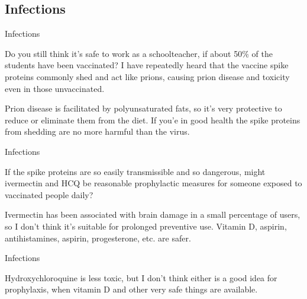 \documentclass[11pt,oneside,openany,extrafontsizes]{memoir}
\begin{document}
\subsection{Infections}

\begin{qaexchange}{Infections}

    \begin{question}
        Do you still think it's safe to work as a schoolteacher, if about 50\% of the students have been vaccinated? I have repeatedly heard that the vaccine spike proteins commonly shed and act like prions, causing prion disease and toxicity even in those unvaccinated.
    \end{question}

    \begin{answer}
        Prion disease is facilitated by polyunsaturated fats, so it's very protective to reduce or eliminate them from the diet. If you'e in good health the spike proteins from shedding are no more harmful than the virus.
    \end{answer}
\end{qaexchange}

\begin{qaexchange}{Infections}

    \begin{question}
        If the spike proteins are so easily transmissible and so dangerous, might ivermectin and HCQ be reasonable prophylactic measures for someone exposed to vaccinated people daily?
    \end{question}

    \begin{answer}
        Ivermectin has been associated with brain damage in a small percentage of users, so I don't think it's suitable for prolonged preventive use. Vitamin D, aspirin, antihistamines, aspirin, progesterone, etc. are safer.
    \end{answer}
\end{qaexchange}

\begin{standalonequote}{Infections}

    \begin{answer}
        Hydroxychloroquine is less toxic, but I don't think either is a good idea for prophylaxis, when vitamin D and other very safe things are available.
    \end{answer}
\end{standalonequote}
\end{document}
